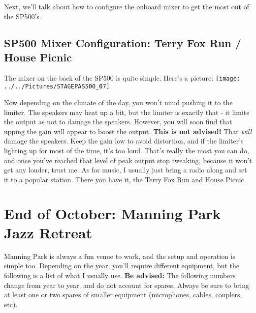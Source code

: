 \documentclass[11pt,a4paper]{book}
\begin{document}
Next, we'll talk about how to configure the onboard mixer to get the most out of the SP500's.
\section{SP500 Mixer Configuration: Terry Fox Run / House Picnic}
The mixer on the back of the SP500 is quite simple. Here's a picture: 
\texttt{[image: ../../Pictures/STAGEPAS500\_07]} 

Now depending on the climate of the day, you won't mind pushing it to the limiter. The speakers may heat up a bit, but the limiter is exactly that - it limits the output as not to damage the speakers. However, you will soon find that upping the gain will appear to boost the output. \textbf{This is not advised!} That \textit{will} damage the speakers. Keep the gain low to avoid distortion, and if the limiter's lighting up for most of the time, it's too loud. That's really the most you can do, and once you've reached that level of peak output stop tweaking, because it won't get any louder, trust me. As for music, I usually just bring a radio along and set it to a popular station. There you have it, the Terry Fox Run and House Picnic.

\chapter{End of October: Manning Park Jazz Retreat}
Manning Park is always a fun venue to work, and the setup and operation is simple too. Depending on the year, you'll require different equipment, but the following is a list of what I usually use. \textbf{Be advised:} The following numbers change from year to year, and do not account for spares. Always be sure to bring at least one or two spares of smaller equipment (microphones, cables, couplers, etc).
\end{document}
